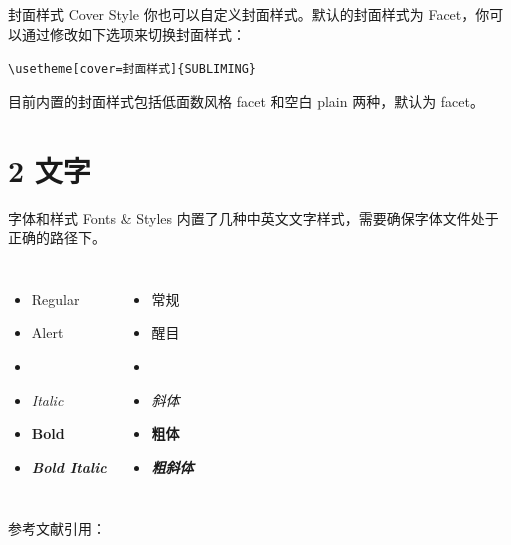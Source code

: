 \documentclass[10pt,aspectratio=169,fontset=none]{ctexbeamer}
\begin{document}
    \begin{frame}{封面样式 Cover Style}
        你也可以自定义封面样式。默认的封面样式为 Facet，你可以通过修改如下选项来切换封面样式：
        \begin{center}
            \texttt{\textcolor{primary}{\textbackslash usetheme}[cover=封面样式]\alert{\{SUBLIMING\}}}
        \end{center}

        目前内置的封面样式包括低面数风格 facet 和空白 plain 两种，默认为 facet。
    \end{frame}


    \section{2 文字}

    \begin{frame}{字体和样式 Fonts \& Styles}
        内置了几种中英文文字样式，需要确保字体文件处于正确的路径下。
        \begin{columns}
            \begin{itemize}
                \item Regular
                \item \alert{Alert}
                \item {}
                \item \textit{Italic}
                \item \textbf{Bold}
                \item \textbf{\textit{Bold Italic}}
            \end{itemize}
            \begin{itemize}
                \item 常规
                \item \alert{醒目}
                \item {}
                \item \textit{斜体}
                \item \textbf{粗体}
                \item \textbf{\textit{粗斜体}}
            \end{itemize}
        \end{columns}
        \vspace*{0.5cm}
        参考文献引用：\cite{Mosher2013} \cite{Asgharzadeh2008} \cite{Frese1999} \cite{Gharti2017}
    \end{frame}
\end{document}
